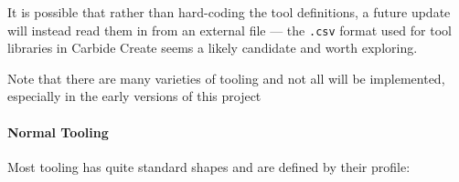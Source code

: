 \documentclass{ltxdoc}
\begin{document}
It is possible that rather than hard-coding the tool definitions, a future update will instead
read them in from an external file --- the \texttt{.csv} format used for tool libraries in 
Carbide Create seems a likely candidate and worth exploring.

Note that there are many varieties of tooling and not all will be implemented, especially in the 
early versions of this project
 
\begin{samepage}
\paragraph{Normal Tooling}

\label{para:normaltooling} Most tooling has quite standard shapes 
and are defined by their profile:


\end{samepage}
\end{document}

